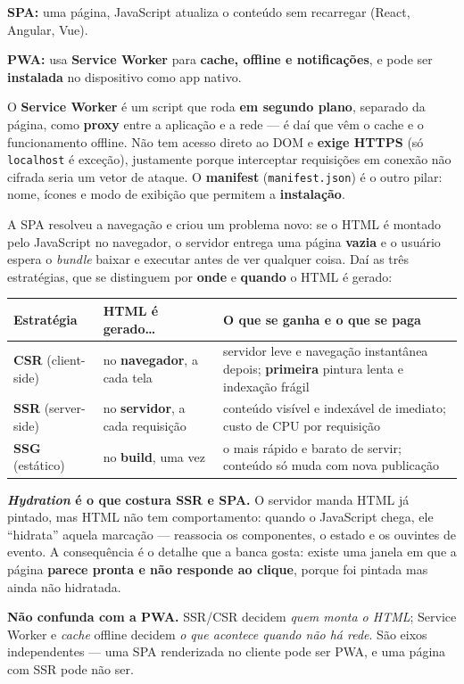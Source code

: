 \textbf{SPA:} uma página, JavaScript atualiza o conteúdo sem recarregar
(React, Angular, Vue).

\textbf{PWA:} usa \textbf{Service Worker} para \textbf{cache, offline e
notificações}, e pode ser \textbf{instalada} no dispositivo como app nativo.

O \textbf{Service Worker} é um script que roda \textbf{em segundo plano},
separado da página, como \textbf{proxy} entre a aplicação e a rede --- é daí
que vêm o cache e o funcionamento offline. Não tem acesso direto ao DOM e
\textbf{exige HTTPS} (só \texttt{localhost} é exceção), justamente porque
interceptar requisições em conexão não cifrada seria um vetor de ataque. O
\textbf{manifest} (\texttt{manifest.json}) é o outro pilar: nome, ícones e
modo de exibição que permitem a \textbf{instalação}.

\begin{conceito}
A SPA resolveu a navegação e criou um problema novo: se o HTML é montado pelo
JavaScript no navegador, o servidor entrega uma página \textbf{vazia} e o
usuário espera o \emph{bundle} baixar e executar antes de ver qualquer coisa.
Daí as três estratégias, que se distinguem por \textbf{onde} e \textbf{quando} o
HTML é gerado:

\begin{center}
\begin{tabular}{@{}p{3.1cm}p{3.5cm}p{4.6cm}@{}}
\toprule
\textbf{Estratégia} & \textbf{HTML é gerado\ldots} & \textbf{O que se ganha e o que se paga} \\
\midrule
\textbf{CSR} (client-side) & no \textbf{navegador}, a cada tela & servidor
leve e navegação instantânea depois; \textbf{primeira} pintura lenta e
indexação frágil \\
\textbf{SSR} (server-side) & no \textbf{servidor}, a cada requisição &
conteúdo visível e indexável de imediato; custo de CPU por requisição \\
\textbf{SSG} (estático) & no \textbf{build}, uma vez & o mais rápido e barato
de servir; conteúdo só muda com nova publicação \\
\bottomrule
\end{tabular}
\end{center}

\textbf{\emph{Hydration} é o que costura SSR e SPA.} O servidor manda HTML já
pintado, mas HTML não tem comportamento: quando o JavaScript chega, ele
``hidrata'' aquela marcação --- reassocia os componentes, o estado e os
ouvintes de evento. A consequência é o detalhe que a banca gosta: existe uma
janela em que a página \textbf{parece pronta e não responde ao clique}, porque
foi pintada mas ainda não hidratada.

\textbf{Não confunda com a PWA.} SSR/CSR decidem \emph{quem monta o HTML};
Service Worker e \emph{cache} offline decidem \emph{o que acontece quando não
há rede}. São eixos independentes --- uma SPA renderizada no cliente pode ser
PWA, e uma página com SSR pode não ser.
\end{conceito}

